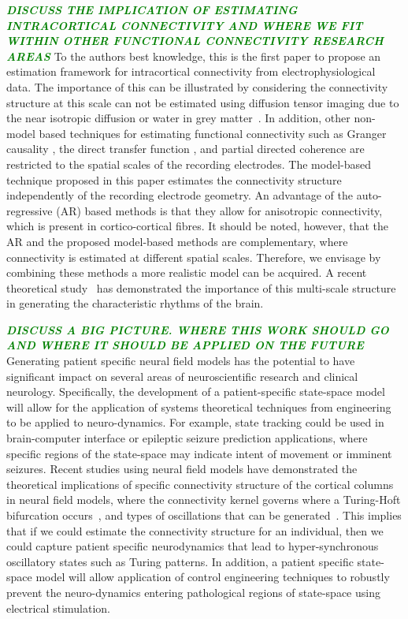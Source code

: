 \documentclass[12pt]{iopart}
\newcommand{\omg}[1]{\textsf{\emph{\textbf{\textcolor{green}{#1}}}}}
\begin{document}
\omg{DISCUSS THE IMPLICATION OF ESTIMATING INTRACORTICAL CONNECTIVITY AND WHERE WE FIT WITHIN OTHER FUNCTIONAL CONNECTIVITY RESEARCH AREAS}
To the authors best knowledge, this is the first paper to propose an estimation framework for intracortical connectivity from electrophysiological data. The importance of this can be illustrated by considering the connectivity structure at this scale can not be estimated using diffusion tensor imaging due to the near isotropic diffusion or water in grey matter~\cite{Assaf2008}. In addition, other non-model based techniques for estimating functional connectivity such as Granger causality \cite{Hesse2003}, the direct transfer function \cite{Kaminski1991}, and partial directed coherence \cite{Sameshima1999} are restricted to the spatial scales of the recording electrodes. The model-based technique proposed in this paper estimates the connectivity structure independently of the recording electrode geometry. An advantage of the auto-regressive (AR) based methods is that they allow for anisotropic connectivity, which is present in cortico-cortical fibres. It should be noted, however, that the AR and the proposed model-based methods are complementary, where connectivity is estimated at different spatial scales. Therefore, we envisage by combining these methods a more realistic model can be acquired. A recent theoretical study~\cite{Jirsa2009} has demonstrated the importance of this multi-scale structure in generating the characteristic rhythms of the brain.

\omg{DISCUSS A BIG PICTURE. WHERE THIS WORK SHOULD GO AND WHERE IT SHOULD BE APPLIED ON THE FUTURE}
Generating patient specific neural field models has the potential to have significant impact on several areas of neuroscientific research and clinical neurology. Specifically, the development of a patient-specific state-space model will allow for the application of systems theoretical techniques from engineering to be applied to neuro-dynamics. For example, state tracking could be used in brain-computer interface or epileptic seizure prediction applications, where specific regions of the state-space may indicate intent of movement or imminent seizures. Recent studies using neural field models have demonstrated the theoretical implications of specific connectivity structure of the cortical columns in neural field models, where the connectivity kernel governs where a Turing-Hoft bifurcation occurs~\cite{Hutt2005}, and types of oscillations that can be generated~\cite{Schmidt2009}. This implies that if we could estimate the connectivity structure for an individual, then we could capture patient specific neurodynamics that lead to hyper-synchronous oscillatory states such as Turing patterns. In addition, a patient specific state-space model will allow application of control engineering techniques to robustly prevent the neuro-dynamics entering pathological regions of state-space using electrical stimulation. 
\end{document}
